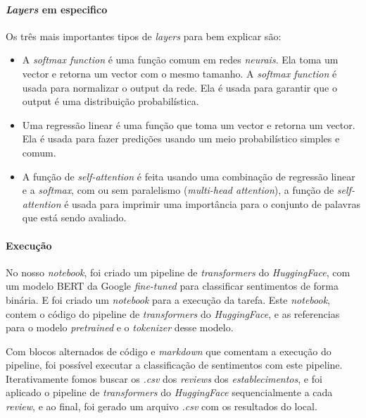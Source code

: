\paragraph{\textit{Layers} em especifico\\}

Os três mais importantes tipos de \textit{layers} para bem explicar são:

\begin{itemize}
    \item A \textit{softmax function} é uma função comum em redes \textit{neurais}. Ela toma um vector e retorna um vector com o mesmo tamanho. A \textit{softmax function} é usada para normalizar o output da rede. Ela é usada para garantir que o output é uma distribuição probabilística.
    \item Uma regressão linear é uma função que toma um vector e retorna um vector. Ela é usada para fazer predições usando um meio probabilístico simples e comum.
    \item A função de \textit{self-attention} é feita usando uma combinação de regressão linear e a \textit{softmax}, com ou sem paralelismo (\textit{multi-head attention}), a função de \textit{self-attention} é usada para imprimir uma importância para o conjunto de palavras que está sendo avaliado.
\end{itemize}

\paragraph{Execução\\}

No nosso \textit{notebook}, foi criado um pipeline de \textit{transformers} do \textit{HuggingFace}, com um modelo BERT da Google \textit{fine-tuned} para classificar sentimentos de forma binária. E foi criado um \textit{notebook} para a execução da tarefa. Este \textit{notebook}, contem o código do pipeline de \textit{transformers} do \textit{HuggingFace}, e as referencias para o modelo \textit{pretrained} e o \textit{tokenizer} desse modelo.

Com blocos alternados de código e \textit{markdown} que comentam a execução do pipeline, foi possível executar a classificação de sentimentos com este pipeline. Iterativamente fomos buscar os \textit{.csv} dos \textit{reviews} dos \textit{establecimentos}, e foi aplicado o pipeline de \textit{transformers} do \textit{HuggingFace} sequencialmente a cada \textit{review}, e ao final, foi gerado um arquivo \textit{.csv} com os resultados do local.

